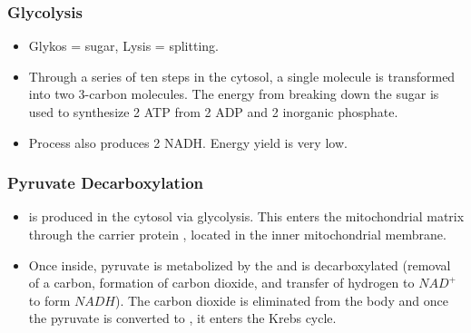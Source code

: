 \documentclass{article}
\numberwithin{equation}{section}
\begin{document}
\subsubsection{Glycolysis}
\begin{itemize}
    \item Glykos = sugar, Lysis = splitting.
    \item Through a series of ten steps in the cytosol, a single  molecule is transformed into two 3-carbon  molecules. The energy from breaking down the sugar is used to synthesize 2 ATP from 2 ADP and 2 inorganic phosphate. 
    \item  Process also produces 2 NADH. Energy yield is very low.
\end{itemize}
\subsubsection{Pyruvate Decarboxylation}
\begin{itemize}
    \item {} is produced in the cytosol via glycolysis. This enters the mitochondrial matrix through the carrier protein , located in the inner mitochondrial membrane.
    \item Once inside, pyruvate is metabolized by the  and is decarboxylated (removal of a carbon, formation of carbon dioxide, and transfer of hydrogen to $NAD^+$ to form $NADH$). The carbon dioxide is eliminated from the body and once the pyruvate is converted to , it enters the Krebs cycle.
\end{itemize}
\end{document}
